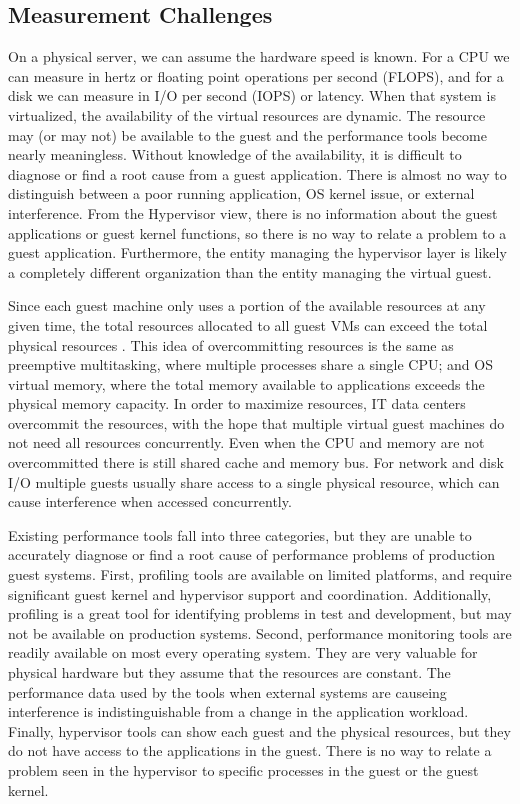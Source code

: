 \subsection{Measurement Challenges}
On a physical server, we can assume the hardware speed is known.  For a CPU we can measure in hertz or floating point operations per second (FLOPS), and for a disk we can measure in I/O per second (IOPS) or latency.  When that system is virtualized, the availability of the virtual resources are dynamic.  The resource may (or may not) be available to the guest and the performance tools become nearly meaningless.  Without knowledge of the availability, it is difficult to diagnose or find a root cause from a guest application. There is almost no way to distinguish between a poor running application, OS kernel issue, or external interference.  From the Hypervisor view, there is no information about the guest applications or guest kernel functions, so there is no way to relate a problem to a guest application.  Furthermore, the entity managing the hypervisor layer is likely a completely different organization than the entity managing the virtual guest. 

Since each guest machine only uses a portion of the available resources at any given time, the total resources allocated to all guest VMs can exceed the total physical resources \cite{huber2, amit, buell1}.   This idea of overcommitting resources is the same as preemptive multitasking, where multiple processes share a single CPU; and OS virtual memory, where the total memory available to applications exceeds the physical memory capacity.  In order to maximize resources, IT data centers overcommit the resources, with the hope that multiple virtual guest machines do not need all resources concurrently.  Even when the CPU and memory are not overcommitted there is still shared cache and memory bus.  For network and disk I/O multiple guests usually share access to a single physical resource, which can cause interference when accessed concurrently.

Existing performance tools fall into three categories, but they are unable to accurately diagnose or find a root cause of performance problems of production guest systems.  First, profiling tools are available on limited platforms, and require significant guest kernel and hypervisor support and coordination.  Additionally, profiling is a great tool for identifying problems in test and development, but may not be available on production systems.  
Second, performance monitoring tools are readily available on most every operating system.  They are very valuable for physical hardware but they assume that the resources are constant.  The performance data used by the tools when external systems are causeing interference is indistinguishable from a change in the application workload.
Finally, hypervisor tools can show each guest and the physical resources, but they do not have access to the applications in the guest.  There is no way to relate a problem seen in the hypervisor to specific processes in the guest or the guest kernel. 

